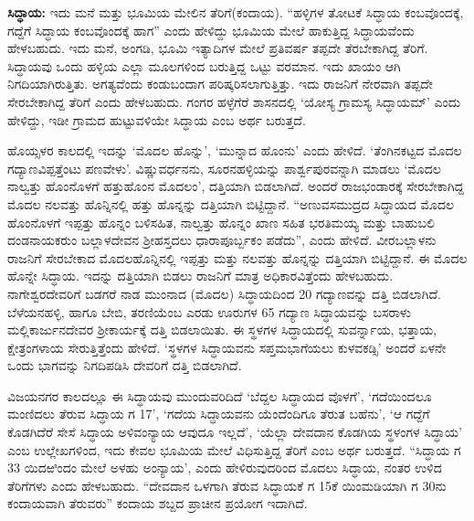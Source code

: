 \textbf{ಸಿದ್ಧಾಯ:} ಇದು ಮನೆ ಮತ್ತು ಭೂಮಿಯ ಮೇಲಿನ ತೆರಿಗೆ(ಕಂದಾಯ). “ಹಳ್ಳಿಗಳ ತೋಟಕೆ ಸಿದ್ಧಾಯ ಕಂಬವೊಂದಕ್ಕೆ, ಗದ್ದೆಗೆ ಸಿದ್ಧಾಯ ಕಂಬವೊಂದಕ್ಕೆ ಹಾಗ” ಎಂದು ಹೇಳಿದ್ದು ಭೂಮಿಯ ಮೇಲೆ ಹಾಕುತ್ತಿದ್ದ ಸಿದ್ಧಾಯವೆಂದು ಹೇಳಬಹುದು. ಇದು ಮನೆ, ಅಂಗಡಿ, ಭೂಮಿ ಇತ್ಯಾದಿಗಳ ಮೇಲೆ ಪ್ರತಿವರ್ಷ ತಪ್ಪದೇ ತೆರಬೇಕಾಗಿದ್ದ ತೆರಿಗೆ. ಸಿದ್ಧಾಯವು ಒಂದು ಹಳ್ಳಿಯ ಎಲ್ಲಾ ಮೂಲಗಳಿಂದ ಬರುತ್ತಿದ್ದ ಒಟ್ಟು ವರಮಾನ. ಇದು ಖಾಯಂ ಆಗಿ ನಿಗದಿಯಾಗಿರುತ್ತಿತು. ಅಗತ್ಯವೆಂದು ಕಂಡುಬಂದಾಗ ಪರಿಷ್ಕರಿಸಲಾಗುತ್ತಿತ್ತು. ಇದು ರಾಜನಿಗೆ ನೇರವಾಗಿ ತಪ್ಪದೇ ಸೇರಬೇಕಾಗಿದ್ದ ತೆರಿಗೆ ಎಂದು ಹೇಳಬಹುದು. ಗಂಗರ ಹಳ್ಳೆಗೆರೆ ಶಾಸನದಲ್ಲಿ ‘ಯೋಸ್ಯ ಗ್ರಾಮಸ್ಯ ಸಿದ್ಧಾಯಮ್’ ಎಂದು ಹೇಳಿದ್ದು, ಇಡೀ ಗ್ರಾಮದ ಹುಟ್ಟುವಳಿಯೇ ಸಿದ್ಧಾಯ ಎಂಬ ಅರ್ಥ ಬರುತ್ತದೆ. 

\newpage

ಹೊಯ್ಸಳರ ಕಾಲದಲ್ಲಿ ಇದನ್ನು ‘ಮೊದಲ ಹೊನ್ನು’, ‘ಮುನ್ನಾದ ಹೊಂನು’ ಎಂದು ಹೇಳಿದೆ. ‘ತೆಂಗಿನಕಟ್ಟದ ಮೊದಲ ಗದ್ಯಾಣವಿಪ್ಪತ್ತೆಂಟು ಪಣವೇಳು’. ವಿಷ್ಣುವರ್ಧನನು, ಸೂರನಹಳ್ಳಿಯನ್ನು ಪಾರ್ಶ್ವಪುರವನ್ನಾಗಿ ಮಾಡಲು ‘ಮೊದಲ ನಾಲ್ವತ್ತು ಹೊಂನೊಳಗೆ ಹತ್ತುಹೊಂನ ಮೊದಲಂ’, ದತ್ತಿಯಾಗಿ ಬಿಡಲಾಗಿದೆ. ಅಂದರೆ ರಾಜಭಂಡಾರಕ್ಕೆ ಸೇರಬೇಕಾಗಿದ್ದ ಮೊದಲ ನಲವತ್ತು ಹೊನ್ನಿನಲ್ಲಿ ಹತ್ತು ಹೊನ್ನನ್ನು ದತ್ತಿಯಾಗಿ ಬಿಟ್ಟಿದ್ದಾನೆ. “ಅಣುವಸಮುದ್ರದ ಸಿದ್ಧಾಯದ ಮೊದಲ ಹೊಂನೊಳಗೆ ಇಪ್ಪತ್ತು ಹೊನ್ನಂ ಬಳಿಸಹಿತ, ನಾಲ್ವತ್ತು ಹೊನ್ನಂ ಖಾಣ ಸಹಿತ ಭರತಿಮಯ್ಯ ಮತ್ತು ಬಾಹುಬಲಿ ದಂಡನಾಯಕರುಂ ಬಲ್ಲಾಳದೇವನ ಶ‍್ರೀಹಸ್ತದಲು ಧಾರಾಪೂರ್ಬ್ಬಕಂ ಪಡೆದು”, ಎಂದು ಹೇಳಿದೆ. ವೀರಬಲ್ಲಾಳನು ರಾಜನಿಗೆ ಸೇರಬೇಕಾದ ಮೊದಲಹೊನ್ನಿನಲ್ಲಿ ಇಪ್ಪತ್ತು ಮತ್ತು ನಲವತ್ತು ಹೊನ್ನನ್ನು ದತ್ತಿಯಾಗಿ ಬಿಟ್ಟಿದ್ದಾನೆ. ಈ ಮೊದಲ ಹೊನ್ನೇ ಸಿದ್ಧಾಯ. ಇದನ್ನು ದತ್ತಿಯಾಗಿ ಬಿಡಲು ರಾಜನಿಗೆ ಮಾತ್ರ ಅಧಿಕಾರವಿತ್ತೆಂದು ಹೇಳಬಹುದು. ನಾಗೇಶ್ವರದೇವರಿಗೆ ಬಡಗರೆ ನಾಡ ಮುಂನಾದ (ಮೊದಲ) ಸಿದ್ಧಾಯದಿಂದ 20 ಗದ್ಯಾಣವನ್ನು ದತ್ತಿ ಬಿಡಲಾಗಿದೆ. ಬೆಳೆಯನಹಳ್ಳಿ, ಹಾಗೂ ಬೇಬಿ, ತರಣಿಯೆಂಬ ಎರಡು ಊರುಗಳ 65 ಗದ್ಯಾಣ ಸಿದ್ಧಾಯವನ್ನು ಬಸರಾಳು ಮಲ್ಲಿಕಾರ್ಜುನದೇವರ ಶ‍್ರೀಕಾರ್ಯಕ್ಕೆ ದತ್ತಿ ಬಿಡಲಾಯಿತು. ಈ ಸ್ಥಳಗಳ ಸಿದ್ಧಾಯದಲ್ಲಿ ಸುವರ್ನ್ನಾಯ, ಭತ್ತಾಯ, ಕ್ಷೇತ್ರಂಗಳಾಯ ಸೇರುತ್ತಿತ್ತೆಂದು ಹೇಳಿದೆ. ‘ಸ್ಥಳಗಳ ಸಿದ್ಧಾಯವನು ಸಪ್ತಮಭಾಗೆಯಲು ಕುಳವಕಡ್ಸಿ’ ಅಂದರೆ ಏಳನೇ ಒಂದು ಭಾಗವನ್ನು ನಿಗದಿಪಡಿಸಿ ದೇವರಿಗೆ ದತ್ತಿ ಬಿಡಲಾಗಿದೆ.

ವಿಜಯನಗರ ಕಾಲದಲ್ಲೂ ಈ ಸಿದ್ಧಾಯವು ಮುಂದುವರಿದಿದೆ ‘ಬೆದ್ದಲ ಸಿದ್ಧಾಯದ ವೊಳಗೆ’, ‘ಗದೆಯಿಂದಲೂ ಮಂಣಿದಲು ತೆರುವ ಸಿದ್ಧಾಯ ಗ 17’, ‘ಗದೆಯ ಸಿದ್ಧಾಯವನು ಯೆಂದೆಂದಿಗೂ ತೆರುತ ಬಹೆನು’, ‘ಆ ಗದ್ದೆಗೆ ಕೊಡಗಿದೆರೆ ಸೇಸೆ ಸಿದ್ಧಾಯ ಅಳಿವಂನ್ಯಾಯ ಆವುದೂ ಇಲ್ಲದೆ’, ‘ಯೆಲ್ಲಾ ದೇವದಾನ ಕೊಡಗಿಯ ಸ್ಥಳಂಗಳ ಸಿದ್ಧಾಯ’ ಎಂಬ ಉಲ್ಲೇಖಗಳಿಂದ, ಇದು ಕೇವಲ ಭೂಮಿಯ ಮೇಲೆ ವಿಧಿಸುತ್ತಿದ್ದ ತೆರಿಗೆ ಎಂಬ ಅರ್ಥ ಬರುತ್ತದೆ. “ಸಿದ್ಧಾಯ ಗ 33 ಯಿದಱಿಂದಂ ಮೇಲೆ ಅಳಹು ಅಂನ್ಯಾಯ’, ಎಂದು ಹೇಳಿರುವುದರಿಂದ ಮೊದಲು ಸಿದ್ಧಾಯ, ನಂತರ ಉಳಿದ ತೆರಿಗೆಗಳು ಎಂದು ಹೇಳಬಹುದು. “ದೇವದಾನ ಒಳಗಾಗಿ ತೆರುವ ಸಿದ್ಧಾಯಕೆ ಗ 15ಕೆ ಯಿಂಮಡಿಯಾಗಿ ಗ 30ನು ಕಂದಾಯವಾಗಿ ತೆರುವರು” ಕಂದಾಯ ಶಬ್ದದ ಪ್ರಾಚೀನ ಪ್ರಯೋಗ ಇದಾಗಿದೆ.

